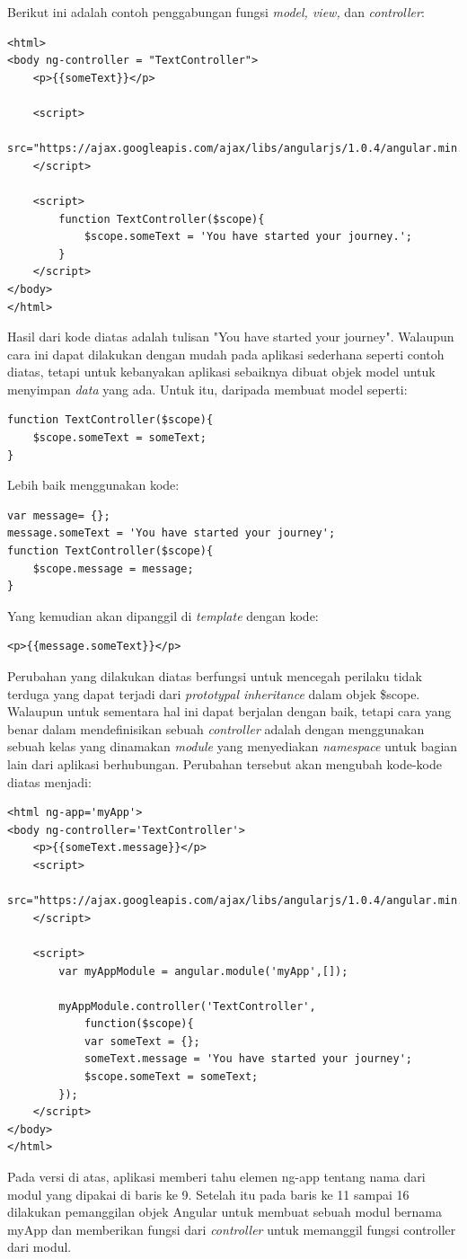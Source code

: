 	Berikut ini adalah contoh penggabungan fungsi \textit{model, view,} dan \textit{controller}:
\begin{lstlisting}
<html>
<body ng-controller = "TextController">
	<p>{{someText}}</p>
	
	<script>
		src="https://ajax.googleapis.com/ajax/libs/angularjs/1.0.4/angular.min.js">
	</script>
	
	<script>
		function TextController($scope){
			$scope.someText = 'You have started your journey.';
		}
	</script>
</body>
</html>
\end{lstlisting}
	
	Hasil dari kode diatas adalah tulisan "You have started your journey". Walaupun cara ini dapat dilakukan dengan mudah pada aplikasi sederhana seperti contoh diatas, tetapi untuk kebanyakan aplikasi sebaiknya dibuat objek model untuk menyimpan \textit{data} yang ada. Untuk itu, daripada membuat model seperti:
	
\begin{lstlisting}
function TextController($scope){
	$scope.someText = someText;
}
\end{lstlisting}
	
	Lebih baik menggunakan kode:
\begin{lstlisting}
var message= {};
message.someText = 'You have started your journey';
function TextController($scope){
	$scope.message = message;
}
\end{lstlisting}
	Yang kemudian akan dipanggil di \textit{template} dengan kode:
\begin{lstlisting}
<p>{{message.someText}}</p>
\end{lstlisting}
	Perubahan yang dilakukan diatas berfungsi untuk mencegah perilaku tidak terduga yang dapat terjadi dari \textit{prototypal inheritance} dalam objek \$scope. Walaupun untuk sementara hal ini dapat berjalan dengan baik, tetapi cara yang benar dalam mendefinisikan sebuah \textit{controller} adalah dengan menggunakan sebuah kelas yang dinamakan \textit{module} yang menyediakan \textit{namespace} untuk bagian lain dari aplikasi berhubungan. Perubahan tersebut akan mengubah kode-kode diatas menjadi:
	\begin{lstlisting}
<html ng-app='myApp'>
<body ng-controller='TextController'>
	<p>{{someText.message}}</p>
	<script>
		src="https://ajax.googleapis.com/ajax/libs/angularjs/1.0.4/angular.min.js">
	</script>
	
	<script>
		var myAppModule = angular.module('myApp',[]);
		
		myAppModule.controller('TextController',
			function($scope){
			var someText = {};
			someText.message = 'You have started your journey';
			$scope.someText = someText;
		});
	</script>
</body>
</html>
	\end{lstlisting}
	Pada versi di atas, aplikasi memberi tahu elemen ng-app tentang nama dari modul yang dipakai di baris ke 9. Setelah itu pada baris ke 11 sampai 16 dilakukan pemanggilan objek Angular untuk membuat sebuah modul bernama myApp dan memberikan fungsi dari \textit{controller} untuk memanggil fungsi controller dari modul.
	

